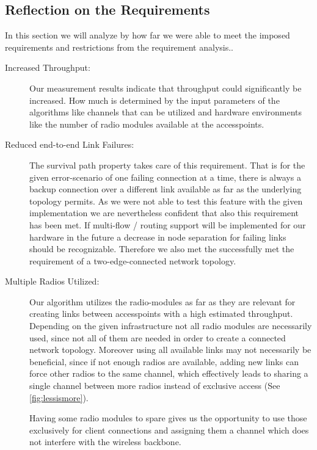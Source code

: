     \subsection{Reflection on the Requirements}
      In this section we will analyze by how far we were able to meet the imposed requirements and restrictions from the requirement analysis..
  
      \begin{description}
	\item [Increased Throughput:]
	  Our measurement results indicate that throughput could significantly be increased. How much is determined by the input parameters of the algorithms like
	  channels that can be utilized and hardware environments like the number of radio modules available at the accesspoints. 
	  
	\item[Reduced end-to-end Link Failures:]
	  The survival path property takes care of this requirement. That is for the given error-scenario of one failing connection at a time, there is always
	  a backup connection over a different link available as far as the underlying topology permits. As we were not able to test this feature 
	  with the given implementation we are nevertheless confident that also this requirement has been met.
	  If multi-flow / routing support will be implemented for our hardware in the future a decrease in node separation for failing links should be recognizable.
	  Therefore we also met the successfully met the requirement of a two-edge-connected network topology.
	  
	\item[Multiple Radios Utilized:]
	  Our algorithm utilizes the radio-modules as far as they are relevant for creating links between accesspoints with a high estimated throughput.
	  Depending on the given infrastructure not all radio modules are necessarily used, since not all of them are needed in order to create a connected network topology.
	  Moreover using all available links may not necessarily be beneficial, since if not enough radios are available, adding new links can force
	  other radios to the same channel, which effectively leads to sharing a single channel between more radios instead of exclusive access (See \ref{fig:lessismore}).
	  
	  Having some radio modules to spare gives us the opportunity to use those exclusively for client 
	  connections and assigning them a channel which does not interfere with the wireless backbone.
	  

\end{description}
